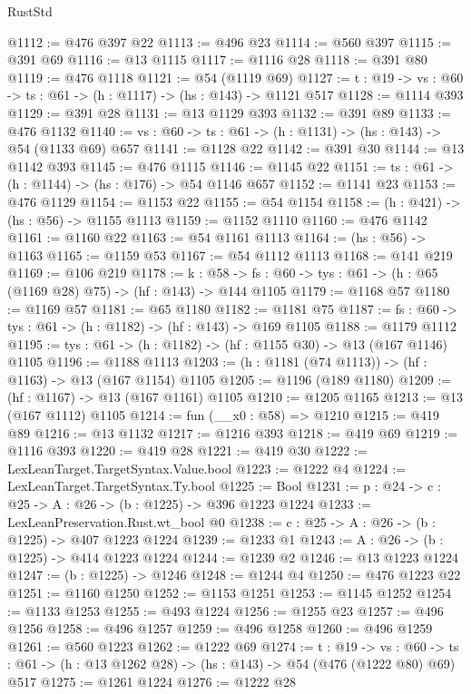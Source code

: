 \begin{lexlean}{RustStd}
\begin{coremodule}
@1112 := @476 @397 @22
@1113 := @496 @23
@1114 := @560 @397
@1115 := @391 @69
@1116 := @13 @1115
@1117 := @1116 @28
@1118 := @391 @80
@1119 := @476 @1118
@1121 := @54 (@1119 @69)
@1127 := {t : @19} -> {vs : @60} -> {ts : @61} -> (h : @1117) -> (hs : @143) -> @1121 @517
@1128 := @1114 @393
@1129 := @391 @28
@1131 := @13 @1129 @393
@1132 := @391 @89
@1133 := @476 @1132
@1140 := {vs : @60} -> {ts : @61} -> (h : @1131) -> (hs : @143) -> @54 (@1133 @69) @657
@1141 := @1128 @22
@1142 := @391 @30
@1144 := @13 @1142 @393
@1145 := @476 @1115
@1146 := @1145 @22
@1151 := {ts : @61} -> (h : @1144) -> (hs : @176) -> @54 @1146 @657
@1152 := @1141 @23
@1153 := @476 @1129
@1154 := @1153 @22
@1155 := @54 @1154
@1158 := (h : @421) -> (hs : @56) -> @1155 @1113
@1159 := @1152 @1110
@1160 := @476 @1142
@1161 := @1160 @22
@1163 := @54 @1161 @1113
@1164 := (hs : @56) -> @1163
@1165 := @1159 @53
@1167 := @54 @1112 @1113
@1168 := @141 @219
@1169 := @106 @219
@1178 := {k : @58} ->
  {fs : @60} -> {tys : @61} -> (h : @65 (@1169 @28) @75) -> (hf : @143) -> @144 @1105
@1179 := @1168 @57
@1180 := @1169 @57
@1181 := @65 @1180
@1182 := @1181 @75
@1187 := {fs : @60} -> {tys : @61} -> (h : @1182) -> (hf : @143) -> @169 @1105
@1188 := @1179 @1112
@1195 := {tys : @61} -> (h : @1182) -> (hf : @1155 @30) -> @13 (@167 @1146) @1105
@1196 := @1188 @1113
@1203 := (h : @1181 (@74 @1113)) -> (hf : @1163) -> @13 (@167 @1154) @1105
@1205 := @1196 (@189 @1180)
@1209 := (hf : @1167) -> @13 (@167 @1161) @1105
@1210 := @1205 @1165
@1213 := @13 (@167 @1112) @1105
@1214 := fun (__x0 : @58) => @1210
@1215 := @419 @89
@1216 := @13 @1132
@1217 := @1216 @393
@1218 := @419 @69
@1219 := @1116 @393
@1220 := @419 @28
@1221 := @419 @30
@1222 := LexLeanTarget.TargetSyntax.Value.bool
@1223 := @1222 @4
@1224 := LexLeanTarget.TargetSyntax.Ty.bool
@1225 := Bool
@1231 := {p : @24} -> {c : @25} -> {A : @26} -> (b : @1225) -> @396 @1223 @1224
@1233 := LexLeanPreservation.Rust.wt_bool @0
@1238 := {c : @25} -> {A : @26} -> (b : @1225) -> @407 @1223 @1224
@1239 := @1233 @1
@1243 := {A : @26} -> (b : @1225) -> @414 @1223 @1224
@1244 := @1239 @2
@1246 := @13 @1223 @1224
@1247 := (b : @1225) -> @1246
@1248 := @1244 @4
@1250 := @476 @1223 @22
@1251 := @1160 @1250
@1252 := @1153 @1251
@1253 := @1145 @1252
@1254 := @1133 @1253
@1255 := @493 @1224
@1256 := @1255 @23
@1257 := @496 @1256
@1258 := @496 @1257
@1259 := @496 @1258
@1260 := @496 @1259
@1261 := @560 @1223
@1262 := @1222 @69
@1274 := {t : @19} ->
  {vs : @60} -> {ts : @61} -> (h : @13 @1262 @28) -> (hs : @143) -> @54 (@476 (@1222 @80) @69) @517
@1275 := @1261 @1224
@1276 := @1222 @28

\end{coremodule}
\end{lexlean}
